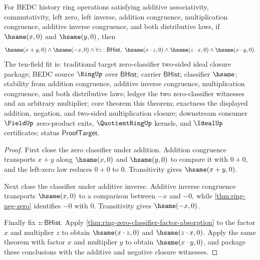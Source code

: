 \begin{theorem}
\label{thm:ring-zero-classifier-two-sided-ideal-package}
For BEDC history ring operations satisfying additive associativity,
commutativity, left zero, left inverse, addition congruence, multiplication
congruence, additive inverse congruence, and both distributive laws, if
$\hsame(x,0)$ and $\hsame(y,0)$, then
$$
\hsame(x+y,0)\land \hsame(-x,0)\land
\forall z:\mathsf{BHist},\ \hsame(x\cdot z,0)\land
\hsame(z\cdot x,0)\land\hsame(x\cdot y,0).
$$
The ten-field fit is: traditional target zero-classifier two-sided ideal
closure package; BEDC source $\RingUp$ over $\mathsf{BHist}$; carrier
$\mathsf{BHist}$; classifier $\hsame$; stability from addition congruence,
additive inverse congruence, multiplication congruence, and both distributive
laws; ledger the two zero-classifier witnesses and an arbitrary multiplier;
core theorem this theorem; exactness the displayed addition, negation, and
two-sided multiplication closure; downstream consumer $\FieldUp$ zero-product
exits, $\QuotientRingUp$ kernels, and $\IdealUp$ certificates; status
$\mathsf{ProofTarget}$.
\end{theorem}
\begin{proof}
First close the zero classifier under addition. Addition congruence transports
$x+y$ along $\hsame(x,0)$ and $\hsame(y,0)$ to compare it with $0+0$, and the
left-zero law reduces $0+0$ to $0$. Transitivity gives $\hsame(x+y,0)$.

Next close the classifier under additive inverse. Additive inverse congruence
transports $\hsame(x,0)$ to a comparison between $-x$ and $-0$, while
\autoref{thm:ring-neg-zero} identifies $-0$ with $0$. Transitivity gives
$\hsame(-x,0)$.

Finally fix $z:\mathsf{BHist}$. Apply
\autoref{thm:ring-zero-classifier-factor-absorption} to the factor $x$ and
multiplier $z$ to obtain $\hsame(x\cdot z,0)$ and $\hsame(z\cdot x,0)$. Apply
the same theorem with factor $x$ and multiplier $y$ to obtain
$\hsame(x\cdot y,0)$, and package these conclusions with the additive and
negative closure witnesses.
\end{proof}

